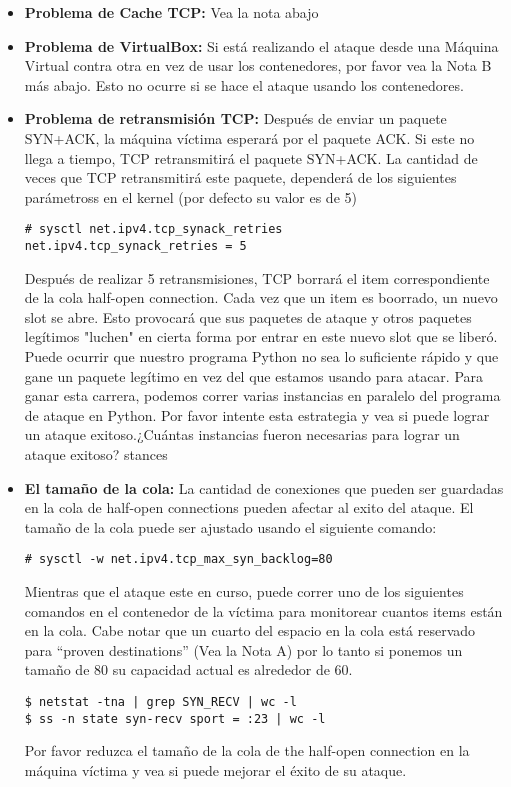 \begin{itemize}
  \item \textbf{Problema de Cache TCP:} Vea la nota abajo

  \item \textbf{Problema de VirtualBox:} Si está realizando el ataque desde una Máquina Virtual contra otra en vez de usar los contenedores, por favor vea la Nota B más abajo. Esto no ocurre si se hace el ataque usando los contenedores.

  \item \textbf{Problema de retransmisión TCP:} 
  Después de enviar un paquete SYN+ACK, la máquina víctima esperará por el paquete ACK. Si este no llega a tiempo, TCP retransmitirá el paquete SYN+ACK. 
  La cantidad de veces que TCP retransmitirá este paquete, dependerá de los siguientes parámetross en el kernel (por defecto su valor es de 5)
    
\begin{lstlisting}
# sysctl net.ipv4.tcp_synack_retries
net.ipv4.tcp_synack_retries = 5
\end{lstlisting}
	
	Después de realizar 5 retransmisiones, TCP borrará el item correspondiente de la cola half-open connection. Cada vez que un item es boorrado, un nuevo slot se abre. Esto provocará que sus paquetes de ataque y otros paquetes legítimos "luchen" en cierta forma por entrar en este nuevo slot que se liberó. Puede ocurrir que nuestro programa Python no sea lo suficiente rápido y que gane un paquete legítimo en vez del que estamos usando para atacar. Para ganar esta carrera, podemos correr varias instancias en paralelo del programa de ataque en Python. Por favor intente esta estrategia y vea si puede lograr un ataque exitoso.¿Cuántas instancias fueron necesarias para lograr un ataque exitoso?
stances 

  \item \textbf{El tamaño de la cola:}  
  	La cantidad de conexiones que pueden ser guardadas en la cola de  half-open connections pueden afectar al exito del ataque. El tamaño de la cola puede ser ajustado usando el siguiente comando:

\begin{lstlisting}
# sysctl -w net.ipv4.tcp_max_syn_backlog=80
\end{lstlisting}
     
     Mientras que el ataque este en curso, puede correr uno de los siguientes comandos en el contenedor de la víctima para monitorear cuantos items están en la cola. Cabe notar que un cuarto del espacio en la cola está reservado para ``proven destinations'' (Vea la Nota A) por lo tanto si ponemos un tamaño de 80 su capacidad actual es alrededor de 60.
     
\begin{lstlisting}
$ netstat -tna | grep SYN_RECV | wc -l
$ ss -n state syn-recv sport = :23 | wc -l
\end{lstlisting}

	Por favor reduzca el tamaño de la cola de the half-open connection en la máquina víctima y vea si puede mejorar el éxito de su ataque.
\end{itemize}


